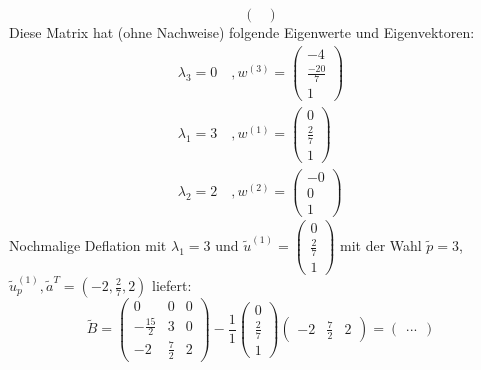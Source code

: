 \begin{egbox}
\[\begin{pmatrix}
    \end{pmatrix}\] 
    Diese Matrix hat (ohne Nachweise) folgende Eigenwerte und Eigenvektoren:
        \begin{align*}
        \lambda_3=0 \quad, w^{(3)}=\begin{pmatrix}
            -4 \\ \tfrac{-20}{7} \\ 1
        \end{pmatrix} \\
        \lambda_1=3 \quad, w^{(1)}=\begin{pmatrix}
            0 \\ \tfrac{2}{7} \\ 1
        \end{pmatrix} \\
        \lambda_2=2 \quad, w^{(2)}=\begin{pmatrix}
            -0 \\ 0 \\ 1
        \end{pmatrix}
    \end{align*}
    Nochmalige Deflation mit $\lambda_1=3$ und $\tilde{u}^{(1)} = \begin{pmatrix}
        0 \\ \tfrac{2}{7} \\ 1
    \end{pmatrix}$ mit der Wahl $\tilde{p}=3$, $\tilde{u}_p^{(1)}, \tilde{a}^T = (-2,\tfrac{2}{7}, 2)$ liefert:
    \[\tilde{B} = \begin{pmatrix}
        0 & 0 & 0 \\ -\tfrac{15}{2} & 3 & 0 \\ -2 & \tfrac{7}{2} & 2
    \end{pmatrix} - \dfrac{1}{1}\begin{pmatrix}
        0 \\ \tfrac{2}{7} \\ 1
    \end{pmatrix}\begin{pmatrix}
    -2 & \tfrac{7}{2} & 2
    \end{pmatrix} = \begin{pmatrix}
        ...
    \end{pmatrix}\]
\end{egbox}